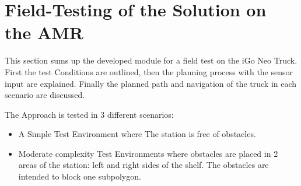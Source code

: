 \begin{table}[H]
    \centering
    \caption{Comparison of Fitness Values of the optimum paths generated by Different Algorithms in Simple and Complex Environments}

    \label{tab:fitness_values}    
\end{table}

\section{Field-Testing of the Solution on the AMR}
This section sums up the developed module for a field test on the iGo Neo Truck. 
First the test Conditions are outlined, then the planning process with the sensor input are explained.
Finally the planned path and navigation of the truck in each scenario are discussed.

The Approach is tested in 3 different scenarios:
\begin{itemize}
    \item A Simple Test Environment where The station is free of obstacles.
    \item Moderate complexity Test Environments where  obstacles are placed in 2 areas of the station:
    left and right sides of the shelf. The obstacles are intended to block one subpolygon.
\end{itemize}

